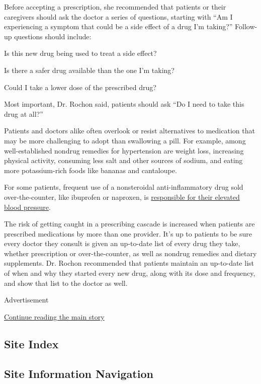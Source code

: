 Before accepting a prescription, she recommended that patients or their
caregivers should ask the doctor a series of questions, starting with
``Am I experiencing a symptom that could be a side effect of a drug I'm
taking?'' Follow-up questions should include:

Is this new drug being used to treat a side effect?

Is there a safer drug available than the one I'm taking?

Could I take a lower dose of the prescribed drug?

Most important, Dr. Rochon said, patients should ask ``Do I need to take
this drug at all?''

Patients and doctors alike often overlook or resist alternatives to
medication that may be more challenging to adopt than swallowing a pill.
For example, among well-established nondrug remedies for hypertension
are weight loss, increasing physical activity, consuming less salt and
other sources of sodium, and eating more potassium-rich foods like
bananas and cantaloupe.

For some patients, frequent use of a nonsteroidal anti-inflammatory drug
sold over-the-counter, like ibuprofen or naproxen, is
\href{https://www.thelancet.com/journals/lancet/article/PIIS0140-6736(17)31188-1/fulltext}{responsible
for their elevated blood pressure}.

The risk of getting caught in a prescribing cascade is increased when
patients are prescribed medications by more than one provider. It's up
to patients to be sure every doctor they consult is given an up-to-date
list of every drug they take, whether prescription or over-the-counter,
as well as nondrug remedies and dietary supplements. Dr. Rochon
recommended that patients maintain an up-to-date list of when and why
they started every new drug, along with its dose and frequency, and show
that list to the doctor as well.

Advertisement

\protect\hyperlink{after-bottom}{Continue reading the main story}

\hypertarget{site-index}{%
\subsection{Site Index}\label{site-index}}

\hypertarget{site-information-navigation}{%
\subsection{Site Information
Navigation}\label{site-information-navigation}}

